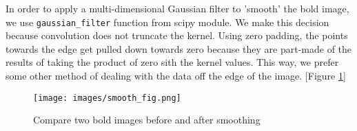 \par \indent In order to apply a multi-dimensional Gaussian filter to 'smooth'
the bold image, we use \texttt{gaussian\_filter} function from scipy module. 
We make this decision because convolution does not truncate the kernel. Using
zero padding, the points towards the edge get pulled down towards zero because
they are part-made of the results of taking the product of zero sith the kernel
values. This way, we prefer some other method of dealing with the data off the
edge of the image. [Figure \ref{fig:smoothing}]
 
\begin{figure}[!ht]
\centering
\texttt{[image: images/smooth\_fig.png]}
\caption{Compare two bold images before and after smoothing}
\label{fig:smoothing}
\end{figure}
